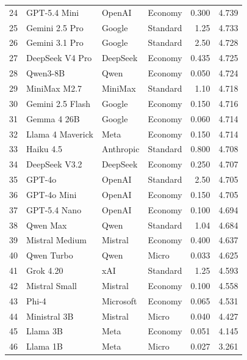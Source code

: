 \begin{table}[htbp]
\begin{tabular}{rlllrr}
24 & GPT-5.4 Mini & OpenAI & Economy & 0.300 & 4.739 \\
25 & Gemini 2.5 Pro & Google & Standard & 1.25 & 4.733 \\
26 & Gemini 3.1 Pro & Google & Standard & 2.50 & 4.728 \\
27 & DeepSeek V4 Pro & DeepSeek & Economy & 0.435 & 4.725 \\
28 & Qwen3-8B & Qwen & Economy & 0.050 & 4.724 \\
29 & MiniMax M2.7 & MiniMax & Standard & 1.10 & 4.718 \\
30 & Gemini 2.5 Flash & Google & Economy & 0.150 & 4.716 \\
31 & Gemma 4 26B & Google & Economy & 0.060 & 4.714 \\
32 & Llama 4 Maverick & Meta & Economy & 0.150 & 4.714 \\
33 & Haiku 4.5 & Anthropic & Standard & 0.800 & 4.708 \\
34 & DeepSeek V3.2 & DeepSeek & Economy & 0.250 & 4.707 \\
35 & GPT-4o & OpenAI & Standard & 2.50 & 4.705 \\
36 & GPT-4o Mini & OpenAI & Economy & 0.150 & 4.705 \\
37 & GPT-5.4 Nano & OpenAI & Economy & 0.100 & 4.694 \\
38 & Qwen Max & Qwen & Standard & 1.04 & 4.684 \\
39 & Mistral Medium & Mistral & Economy & 0.400 & 4.637 \\
40 & Qwen Turbo & Qwen & Micro & 0.033 & 4.625 \\
41 & Grok 4.20 & xAI & Standard & 1.25 & 4.593 \\
42 & Mistral Small & Mistral & Economy & 0.100 & 4.558 \\
43 & Phi-4 & Microsoft & Economy & 0.065 & 4.531 \\
44 & Ministral 3B & Mistral & Micro & 0.040 & 4.427 \\
45 & Llama 3B & Meta & Economy & 0.051 & 4.145 \\
46 & Llama 1B & Meta & Micro & 0.027 & 3.261 \\
\bottomrule
\end{tabular}
\end{table}
